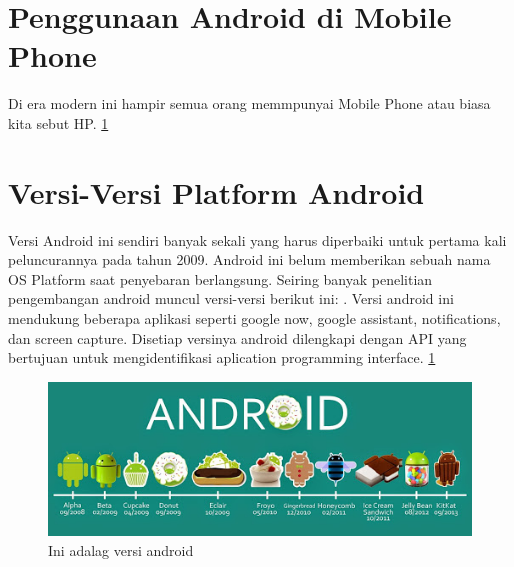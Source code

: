 \section{Penggunaan Android di Mobile Phone}
Di era modern ini hampir semua orang memmpunyai Mobile Phone atau biasa kita sebut HP. \cite{triadi2013bedah}
	\ref{gambarversiandroid}
	\section{Versi-Versi Platform Android}
		Versi Android ini sendiri banyak sekali yang harus diperbaiki untuk pertama kali peluncurannya pada tahun 2009. Android ini belum memberikan sebuah nama OS Platform
		saat penyebaran berlangsung. Seiring banyak penelitian pengembangan android muncul versi-versi berikut ini: \cite{suryani2015rancang}. Versi android ini mendukung beberapa aplikasi seperti google now, google assistant, notifications, dan screen capture.
		Disetiap versinya android dilengkapi dengan API yang bertujuan untuk mengidentifikasi aplication programming interface.
\ref{gambarversiandroid}
\begin{figure}[ht]
\centerline{\includegraphics[width=1\textwidth]{figures/gambarversiandroid.jpg}}
\caption{Ini adalag versi android}
\label{gambarversiandroid}
\end{figure}

